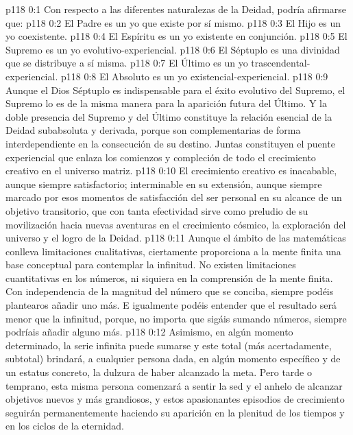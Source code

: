\author{Mensajero poderoso}
\vs p118 0:1 Con respecto a las diferentes naturalezas de la Deidad, podría afirmarse que:
\vs p118 0:2 El Padre es un yo que existe por sí mismo.
\vs p118 0:3 El Hijo es un yo coexistente.
\vs p118 0:4 El Espíritu es un yo existente en conjunción.
\vs p118 0:5 El Supremo es un yo evolutivo\hyp{}experiencial.
\vs p118 0:6 El Séptuplo es una divinidad que se distribuye a sí misma.
\vs p118 0:7 El Último es un yo trascendental\hyp{}experiencial.
\vs p118 0:8 El Absoluto es un yo existencial\hyp{}experiencial.
\vs p118 0:9 \pc Aunque el Dios Séptuplo es indispensable para el éxito evolutivo del Supremo, el Supremo lo es de la misma manera para la aparición futura del Último. Y la doble presencia del Supremo y del Último constituye la relación esencial de la Deidad subabsoluta y derivada, porque son complementarias de forma interdependiente en la consecución de su destino. Juntas constituyen el puente experiencial que enlaza los comienzos y compleción de todo el crecimiento creativo en el universo matriz.
\vs p118 0:10 \pc El crecimiento creativo es inacabable, aunque siempre satisfactorio; interminable en su extensión, aunque siempre marcado por esos momentos de satisfacción del ser personal en su alcance de un objetivo transitorio, que con tanta efectividad sirve como preludio de su movilización hacia nuevas aventuras en el crecimiento cósmico, la exploración del universo y el logro de la Deidad.
\vs p118 0:11 Aunque el ámbito de las matemáticas conlleva limitaciones cualitativas, ciertamente proporciona a la mente finita una base conceptual para contemplar la infinitud. No existen limitaciones cuantitativas en los números, ni siquiera en la comprensión de la mente finita. Con independencia de la magnitud del número que se conciba, siempre podéis plantearos añadir uno más. E igualmente podéis entender que el resultado será menor que la infinitud, porque, no importa que sigáis sumando números, siempre podríais añadir alguno más.
\vs p118 0:12 Asimismo, en algún momento determinado, la serie infinita puede sumarse y este total (más acertadamente, subtotal) brindará, a cualquier persona dada, en algún momento específico y de un estatus concreto, la dulzura de haber alcanzado la meta. Pero tarde o temprano, esta misma persona comenzará a sentir la sed y el anhelo de alcanzar objetivos nuevos y más grandiosos, y estos apasionantes episodios de crecimiento seguirán permanentemente haciendo su aparición en la plenitud de los tiempos y en los ciclos de la eternidad.
